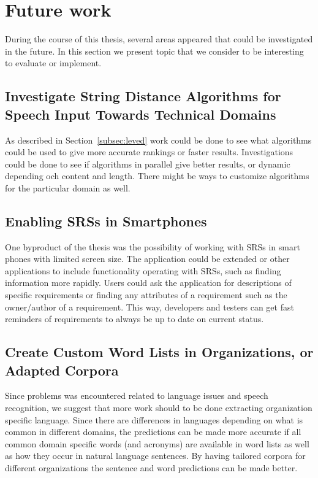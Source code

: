 \section{Future work}
During the course of this thesis, several areas appeared that could be investigated in the future. In this section we present topic that we consider to be interesting to evaluate or implement.

\subsection{Investigate String Distance Algorithms for Speech Input Towards Technical Domains}
As described in Section~\ref{subsec:leved} work could be done to see what algorithms could be used to give more accurate rankings or faster results. Investigations could be done to see if algorithms in parallel give better results, or dynamic depending och content and length. There might be ways to customize algorithms for the particular domain as well.

\subsection{Enabling SRSs in Smartphones}
One byproduct of the thesis was the possibility of working with SRSs in smart phones with limited screen size. The application could be extended or other applications to include functionality operating with SRSs, such as finding information more rapidly. Users could ask the application for descriptions of specific requirements or finding any attributes of a requirement such as the owner/author of a requirement. This way, developers and testers can get fast reminders of requirements to always be up to date on current status.

\subsection{Create Custom Word Lists in Organizations, or Adapted Corpora}
Since problems was encountered related to language issues and speech recognition, we suggest that more work should to be done extracting organization specific language. Since there are differences in languages depending on what is common in different domains, the predictions can be made more accurate if all common domain specific words (and acronyms) are available in word lists as well as how they occur in natural language sentences. By having tailored corpora for different organizations the sentence and word predictions can be made better. 

